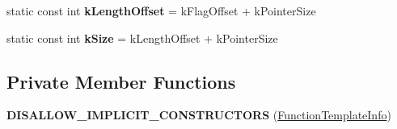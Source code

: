 \begin{DoxyCompactItemize}
\item 
static const int {\bfseries k\+Length\+Offset} = k\+Flag\+Offset + k\+Pointer\+Size\hypertarget{classv8_1_1internal_1_1_function_template_info_a3486aacd2eec65a1118faa477ea213ea}{}\label{classv8_1_1internal_1_1_function_template_info_a3486aacd2eec65a1118faa477ea213ea}

\item 
static const int {\bfseries k\+Size} = k\+Length\+Offset + k\+Pointer\+Size\hypertarget{classv8_1_1internal_1_1_function_template_info_a3b835a83d17c1b75f9d619017e7d985b}{}\label{classv8_1_1internal_1_1_function_template_info_a3b835a83d17c1b75f9d619017e7d985b}

\end{DoxyCompactItemize}
\subsection*{Private Member Functions}
\begin{DoxyCompactItemize}
\item 
{\bfseries D\+I\+S\+A\+L\+L\+O\+W\+\_\+\+I\+M\+P\+L\+I\+C\+I\+T\+\_\+\+C\+O\+N\+S\+T\+R\+U\+C\+T\+O\+RS} (\hyperlink{classv8_1_1internal_1_1_function_template_info}{Function\+Template\+Info})\hypertarget{classv8_1_1internal_1_1_function_template_info_ae916d1b0f8efa79f8f90cf3c79382c38}{}\label{classv8_1_1internal_1_1_function_template_info_ae916d1b0f8efa79f8f90cf3c79382c38}

\end{DoxyCompactItemize}
